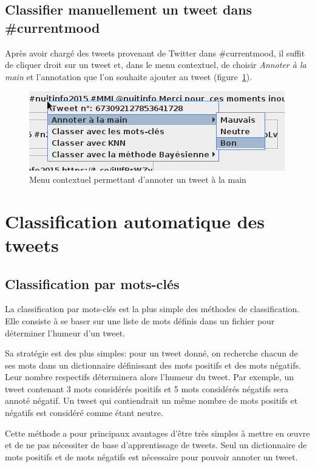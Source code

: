 \documentclass[12pt,a4paper]{report}
\newcommand{\CMName}{\#currentmood}
\begin{document}
\section{Classifier manuellement un tweet dans \CMName}
Après avoir chargé des tweets provenant de Twitter dans \CMName, il suffit de
cliquer droit sur un tweet et, dans le menu contextuel, de choisir
\textit{Annoter à la main} et l'annotation que l'on souhaite ajouter au tweet
(figure~\ref{capture-annoter-a-la-main}).

\begin{figure}
    \centering
    \includegraphics{img/capture-annoter-a-la-main.png}
    \caption{Menu contextuel permettant d'annoter un tweet à la main}
    \label{capture-annoter-a-la-main}
\end{figure}

\chapter{Classification automatique des tweets}
\label{chapter-classifications}

\section{Classification par mots-clés}
La classification par mots-clés est la plus simple des méthodes de
classification. Elle consiste à se baser sur une liste de mots définis dans un
fichier pour déterminer l'humeur d'un tweet.

Sa stratégie est des plus simples: pour un tweet donné, on recherche
chacun de ses mots dans un dictionnaire définissant des mots positifs et des
mots négatifs. Leur nombre respectifs déterminera alors l'humeur du tweet. Par
exemple, un tweet contenant 3 mots considérés positifs et 5 mots considérés
négatifs sera annoté négatif. Un tweet qui contiendrait un même nombre de mots
positifs et négatifs est considéré comme étant neutre.

Cette méthode a pour principaux avantages d'être très simples à mettre en œuvre
et de ne pas nécessiter de base d'apprentissage de tweets. Seul un dictionnaire
de mots positifs et de mots négatifs est nécessaire pour pouvoir annoter un
tweet.
\end{document}
